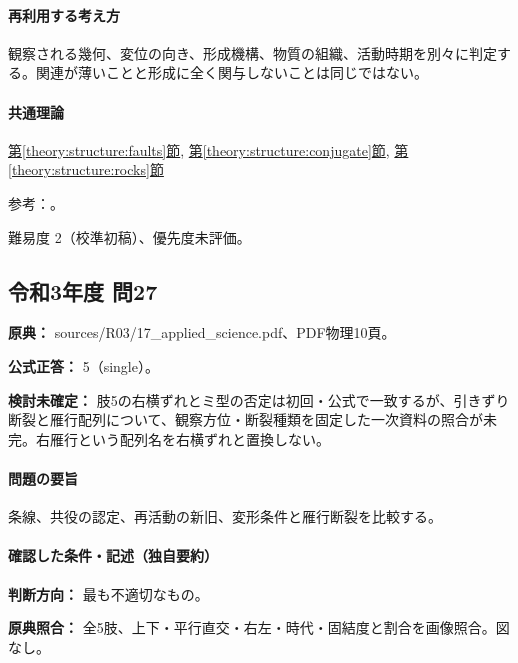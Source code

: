 \paragraph{再利用する考え方} 観察される幾何、変位の向き、形成機構、物質の組織、活動時期を別々に判定する。関連が薄いことと形成に全く関与しないことは同じではない。

\paragraph{共通理論} \hyperref[theory:structure:faults]{第\ref*{theory:structure:faults}節}, \hyperref[theory:structure:conjugate]{第\ref*{theory:structure:conjugate}節}, \hyperref[theory:structure:rocks]{第\ref*{theory:structure:rocks}節}

\par 参考：\cite{str_faultrocks,str_shear}。

\par 難易度 2（校準初稿）、優先度未評価。

\subsection{令和3年度 問27}
\label{q:r03-reg-applied-27}

\noindent\textbf{原典：} sources/R03/17\_applied\_science.pdf、PDF物理10頁。

\textbf{公式正答：} 5（single）。

\par\textbf{検討未確定：} 肢5の右横ずれとミ型の否定は初回・公式で一致するが、引きずり断裂と雁行配列について、観察方位・断裂種類を固定した一次資料の照合が未完。右雁行という配列名を右横ずれと置換しない。

\paragraph{問題の要旨} 条線、共役の認定、再活動の新旧、変形条件と雁行断裂を比較する。

\paragraph{確認した条件・記述（独自要約）}\mbox{}\par

\noindent\textbf{判断方向：} 最も不適切なもの。\par

\noindent\textbf{原典照合：} 全5肢、上下・平行直交・右左・時代・固結度と割合を画像照合。図なし。\par

